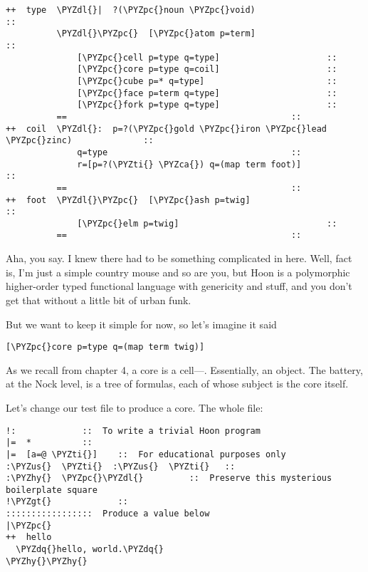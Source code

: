\begin{framed_shaded}
\begin{Verbatim}[fontsize=\relsize{-2.5},fontseries=b,commandchars=\\\{\}]
++  type  \PYZdl{}|  ?(\PYZpc{}noun \PYZpc{}void)                            ::
          \PYZdl{}\PYZpc{}  [\PYZpc{}atom p=term]                            ::
              [\PYZpc{}cell p=type q=type]                     ::
              [\PYZpc{}core p=type q=coil]                     ::
              [\PYZpc{}cube p=* q=type]                        ::
              [\PYZpc{}face p=term q=type]                     ::
              [\PYZpc{}fork p=type q=type]                     ::
          ==                                            ::
++  coil  \PYZdl{}:  p=?(\PYZpc{}gold \PYZpc{}iron \PYZpc{}lead \PYZpc{}zinc)              ::
              q=type                                    ::
              r=[p=?(\PYZti{} \PYZca{}) q=(map term foot)]            ::
          ==                                            ::
++  foot  \PYZdl{}\PYZpc{}  [\PYZpc{}ash p=twig]                             ::
              [\PYZpc{}elm p=twig]                             ::
          ==                                            ::
\end{Verbatim}
\end{framed_shaded}
Aha, you say.  I knew there had to be something complicated in
here.  Well, fact is, I'm just a simple country mouse and so are
you, but Hoon is a polymorphic higher-order typed functional
language with genericity and stuff, and you don't get that
without a little bit of urban funk.

But we want to keep it simple for now, so let's imagine it said

\begin{framed_shaded}
\begin{Verbatim}[fontsize=\relsize{-2.5},fontseries=b,commandchars=\\\{\}]
[\PYZpc{}core p=type q=(map term twig)]
\end{Verbatim}
\end{framed_shaded}
As we recall from chapter 4, a core is a  cell---.  Essentially, an object.  The battery, at
the Nock level, is a tree of formulas, each of whose subject 
is the core itself.

Let's change our test file to produce a core.  The whole file:

\begin{framed_shaded}
\begin{Verbatim}[fontsize=\relsize{-2.5},fontseries=b,commandchars=\\\{\}]
!:             ::  To write a trivial Hoon program
|=  *          ::
|=  [a=@ \PYZti{}]    ::  For educational purposes only
:\PYZus{}  \PYZti{}  :\PYZus{}  \PYZti{}   ::
:\PYZhy{}  \PYZpc{}\PYZdl{}         ::  Preserve this mysterious boilerplate square
!\PYZgt{}             ::
:::::::::::::::::  Produce a value below
|\PYZpc{}
++  hello
  \PYZdq{}hello, world.\PYZdq{}
\PYZhy{}\PYZhy{}
\end{Verbatim}
\end{framed_shaded}

